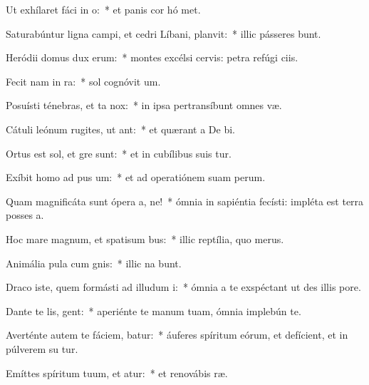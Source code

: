\item Ut exhílaret fáci in o:~* et panis cor hó met.
\item Saturabúntur ligna campi, et cedri Líbani,  planvit:~* illic pásseres bunt.
\item Heródii domus dux  erum:~* montes excélsi cervis: petra refúgi ciis.
\item Fecit nam in ra:~* sol cognóvit  um.
\item Posuísti ténebras, et ta  nox:~* in ipsa pertransíbunt omnes  væ.
\item Cátuli leónum rugites, ut ant:~* et quærant a De  bi.
\item Ortus est sol, et gre sunt:~* et in cubílibus suis tur.
\item Exíbit homo ad pus um:~* et ad operatiónem suam   perum.
\item Quam magnificáta sunt ópera a, ne!~* ómnia in sapiéntia fecísti: impléta est terra posses a.
\item Hoc mare magnum, et spatisum bus:~* illic reptília, quo   merus.
\item Animália pula cum gnis:~* illic na bunt.
\item Draco iste, quem formásti ad illudum i:~* ómnia a te exspéctant ut des illis   pore.
\item Dante te lis, gent:~* aperiénte te manum tuam, ómnia implebún te.
\item Averténte autem te fáciem, batur:~* áuferes spíritum eórum, et defícient, et in púlverem su tur.
\item Emíttes spíritum tuum, et atur:~* et renovábis  ræ.

